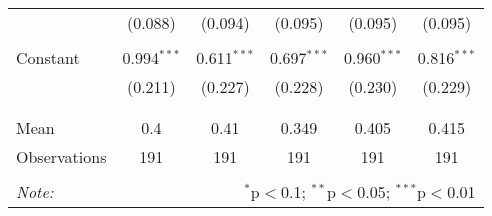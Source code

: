 \begin{tabular}{@{\extracolsep{5pt}}lccccc}
  & (0.088) & (0.094) & (0.095) & (0.095) & (0.095) \\ 
  & & & & & \\ 
 Constant & 0.994$^{***}$ & 0.611$^{***}$ & 0.697$^{***}$ & 0.960$^{***}$ & 0.816$^{***}$ \\ 
  & (0.211) & (0.227) & (0.228) & (0.230) & (0.229) \\ 
  & & & & & \\ 
\hline \\[-1.8ex] 
Mean & 0.4 & 0.41 & 0.349 & 0.405 & 0.415 \\ 
Observations & 191 & 191 & 191 & 191 & 191 \\ 
\hline 
\hline \\[-1.8ex] 
\textit{Note:}  & \multicolumn{5}{r}{$^{*}$p$<$0.1; $^{**}$p$<$0.05; $^{***}$p$<$0.01} \\ 
\end{tabular} 
